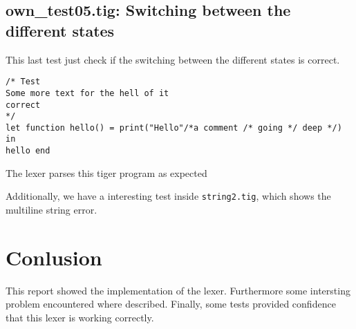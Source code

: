 \documentclass{article}
\begin{document}
\subsection{own\_test05.tig: Switching between the different states}
This last test just check if the switching between the different states is correct.

\begin{lstlisting}[frame=single]
/* Test 
Some more text for the hell of it
correct
*/
let function hello() = print("Hello"/*a comment /* going */ deep */) in 
hello end
\end{lstlisting}
The lexer parses this tiger program as expected

Additionally, we have a interesting test inside \texttt{string2.tig}, which shows the multiline string error.

\section{Conlusion}
This report showed the implementation of the lexer. Furthermore some intersting problem encountered where described. Finally, some tests provided confidence that this lexer is working correctly.
\end{document}
